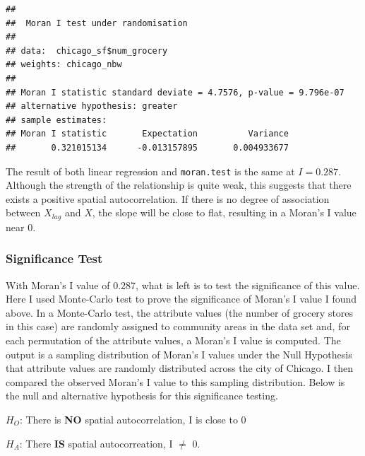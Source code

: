 \documentclass[
]{article}
\begin{document}
\begin{verbatim}
## 
##  Moran I test under randomisation
## 
## data:  chicago_sf$num_grocery  
## weights: chicago_nbw    
## 
## Moran I statistic standard deviate = 4.7576, p-value = 9.796e-07
## alternative hypothesis: greater
## sample estimates:
## Moran I statistic       Expectation          Variance 
##       0.321015134      -0.013157895       0.004933677
\end{verbatim}

The result of both linear regression and \texttt{moran.test} is the same
at \(I = 0.287\). Although the strength of the relationship is quite
weak, this suggests that there exists a positive spatial
autocorrelation. If there is no degree of association between
\(X_{lag}\) and \(X\), the slope will be close to flat, resulting in a
Moran's I value near 0.

\hypertarget{significance-test}{%
\subsubsection{Significance Test}\label{significance-test}}

With Moran's I value of 0.287, what is left is to test the significance
of this value. Here I used Monte-Carlo test to prove the significance of
Moran's I value I found above. In a Monte-Carlo test, the attribute
values (the number of grocery stores in this case) are randomly assigned
to community areas in the data set and, for each permutation of the
attribute values, a Moran's I value is computed. The output is a
sampling distribution of Moran's I values under the Null Hypothesis that
attribute values are randomly distributed across the city of Chicago. I
then compared the observed Moran's I value to this sampling
distribution. Below is the null and alternative hypothesis for this
significance testing.

\(H_O\): There is \textbf{NO} spatial autocorrelation, I is close to 0

\(H_A\): There \textbf{IS} spatial autocorreation, I \(\neq\) 0.
\end{document}
